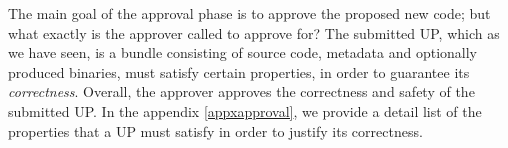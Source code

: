
The main goal of the approval phase is to approve the proposed new code; but what exactly is the approver called to approve for? The submitted UP, which as we have seen, is a bundle consisting of source code, metadata and optionally produced binaries, must satisfy certain properties, in order to guarantee its \emph{correctness}. Overall, the approver approves the correctness and safety of the submitted UP. In the appendix \ref{appxapproval}, we provide a detail list of the properties that a UP must satisfy in order to justify its correctness.


%
%
%

